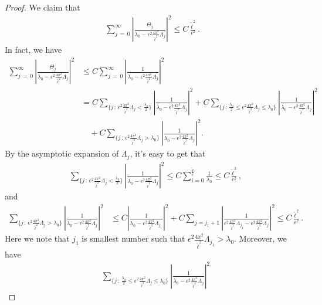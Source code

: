 \documentclass[10pt, reqno]{amsart}
\numberwithin{equation}{section}
\theoremstyle{definition}
\begin{document}
{\begin{proof}
We claim that
\begin{align} \label{linfty claim}
\sum_{j \,=\, 0}^\infty \left|\frac{ \Theta_j} {\lambda_0 - \epsilon^2\frac{4\pi^2}{{\tilde\ell}^2}\Lambda_j} \right|^2 \le C \frac {{\tilde\ell^2}}{\epsilon^2}.
\end{align}
In fact, we have
\begin{align*}
\sum_{j \,=\, 0}^\infty \left|\frac{ \Theta_j} {\lambda_0 - \epsilon^2\frac{4\pi^2}{{\tilde\ell}^2}\Lambda_j} \right|^2
&
 \le C \sum_{j \,=\, 0}^\infty \left|\frac{1} {\lambda_0 - \epsilon^2\frac{4\pi^2}{{\tilde\ell}^2}\Lambda_j} \right|^2
\nonumber
\\ &
 = C \sum_{\{j \,:\,  \epsilon^2\frac{4\pi^2}{{\tilde\ell}^2}\Lambda_j < \frac{\lambda_0}2 \}} \left|\frac{1} {\lambda_0 - \epsilon^2\frac{4\pi^2}{{\tilde\ell}^2}\Lambda_j} \right|^2
  + C \sum_{\{j \,:\,  \frac{\lambda_0}2 \le \epsilon^2\frac{4\pi^2}{{\tilde\ell}^2}\Lambda_j \le \lambda_0 \}} \left|\frac{1} {\lambda_0 - \epsilon^2\frac{4\pi^2}{{\tilde\ell}^2}\Lambda_j} \right|^2
\nonumber
\\ & \quad
 +C \sum_{\{j \,:\, \epsilon^2\frac{4\pi^2}{{\tilde\ell}^2}\Lambda_j > \lambda_0\}} \left|\frac{1} {\lambda_0 - \epsilon^2\frac{4\pi^2}{{\tilde\ell}^2}\Lambda_j} \right|^2.
\end{align*}
By the asymptotic expansion of $\Lambda_j$, it's easy to get that
\begin{align*}
 &\sum_{\{j \,:\,  \epsilon^2\frac{4\pi^2}{{\tilde\ell}^2}\Lambda_j < \frac{\lambda_0}2 \}} \left|\frac{1} {\lambda_0 - \epsilon^2\frac{4\pi^2}{{\tilde\ell}^2}\Lambda_j} \right|^2
 \le
C \sum_{i =0}^{\frac{\tilde\ell} \epsilon} \frac 1{\lambda_0} \le C \frac{{\tilde\ell}^2} {\epsilon^2},
\end{align*}
and
\begin{align*}
\sum_{\{j \,:\,  \epsilon^2\frac{4\pi^2}{{\tilde\ell}^2}\Lambda_j > \lambda_0\}} \left|\frac{1} {\lambda_0 - \epsilon^2\frac{4\pi^2}{{\tilde\ell}^2}\Lambda_j} \right|^2
& \le C \left|\frac{1} {\lambda_0 - \epsilon^2\frac{4\pi^2}{{\tilde\ell}^2}\Lambda_{j_1}} \right|^2
+
C \sum_{j =j_1+1} \left|\frac{1} {\epsilon^2\frac{4\pi^2}{{\tilde\ell}^2}\Lambda_{j_1} - \epsilon^2\frac{4\pi^2}{{\tilde\ell}^2}\Lambda_j} \right|^2 \le C \frac{\tilde\ell^2} {\epsilon^2}.
\end{align*}
Here we note that $j_1$ is smallest number such that $\epsilon^2\frac{4\pi^2}{{\tilde\ell}^2}\Lambda_{j_1} > \lambda_0.$
 Moreover, we have
\begin{align*}
 & \sum_{\{j \,:\,  \frac{\lambda_0}2 \le \epsilon^2\frac{4\pi^2}{{\tilde\ell}^2}\Lambda_j \le \lambda_0 \}} \left|\frac{1} {\lambda_0 - \epsilon^2\frac{4\pi^2}{{\tilde\ell}^2}\Lambda_j} \right|^2

\end{align*}
\end{proof}}
\end{document}
